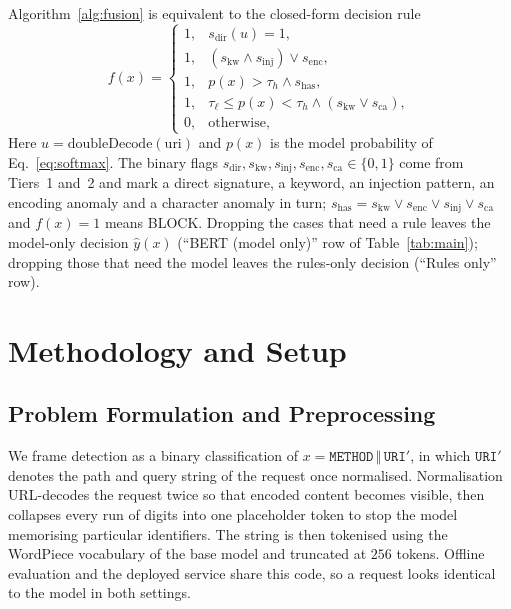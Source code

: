 \documentclass[conference]{IEEEtran}
\begin{document}
Algorithm~\ref{alg:fusion} is equivalent to the closed-form decision rule
\begin{equation}
f(x) =
\begin{cases}
1, & s_{\text{dir}}(u) = 1, \\[2pt]
1, & (s_{\text{kw}} \wedge s_{\text{inj}}) \vee s_{\text{enc}}, \\[2pt]
1, & p(x) > \tau_h \wedge s_{\text{has}}, \\[2pt]
1, & \tau_\ell \le p(x) < \tau_h \wedge (s_{\text{kw}} \vee s_{\text{ca}}), \\[2pt]
0, & \text{otherwise},
\end{cases}
\label{eq:fusion}
\end{equation}
Here $u=\text{doubleDecode}(\text{uri})$ and $p(x)$ is the model
probability of Eq.~\eqref{eq:softmax}. The binary flags
$s_{\text{dir}},s_{\text{kw}},s_{\text{inj}},s_{\text{enc}},s_{\text{ca}}\in\{0,1\}$
come from Tiers~1 and~2 and mark a direct signature, a keyword, an
injection pattern, an encoding anomaly and a character anomaly in turn;
$s_{\text{has}}=s_{\text{kw}}\vee s_{\text{enc}}\vee s_{\text{inj}}\vee s_{\text{ca}}$
and $f(x)=1$ means BLOCK. Dropping the cases that need a rule leaves the model-only decision
$\hat y(x)$ (``BERT (model only)'' row of Table~\ref{tab:main}); dropping
those that need the model leaves the rules-only decision (``Rules only''
row).

\section{Methodology and Setup}

\subsection{Problem Formulation and Preprocessing}
We frame detection as a binary classification of
$x=\texttt{METHOD}\,\Vert\,\texttt{URI}'$, in which $\texttt{URI}'$ denotes
the path and query string of the request once normalised. Normalisation
URL-decodes the request twice so that encoded content becomes visible, then
collapses every run of digits into one placeholder token to stop the model
memorising particular identifiers. The string is then tokenised using the
WordPiece vocabulary of the base model and truncated at $256$ tokens.
Offline evaluation and the deployed service share this code, so a request
looks identical to the model in both settings.
\end{document}
